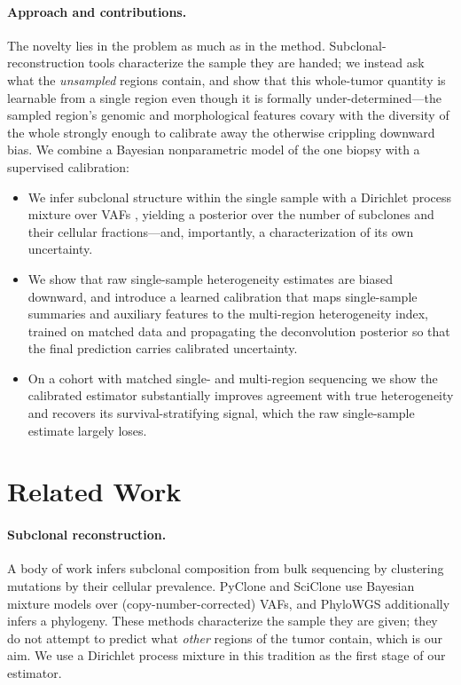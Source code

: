 \documentclass{article}
\begin{document}
\paragraph{Approach and contributions.} The novelty lies in the problem as much as in
the method. Subclonal-reconstruction tools \citep{Roth2014,Miller2014} characterize
the sample they are handed; we instead ask what the \emph{unsampled} regions contain,
and show that this whole-tumor quantity is learnable from a single region even though
it is formally under-determined---the sampled region's genomic and morphological
features covary with the diversity of the whole strongly enough to calibrate away the
otherwise crippling downward bias. We combine a Bayesian nonparametric model of the
one biopsy with a supervised calibration:
\begin{itemize}
\item We infer subclonal structure within the single sample with a Dirichlet process
mixture over VAFs \citep{Roth2014,Miller2014}, yielding a posterior over the number
of subclones and their cellular fractions---and, importantly, a characterization of
its own uncertainty.
\item We show that raw single-sample heterogeneity estimates are biased downward, and
introduce a learned calibration that maps single-sample summaries and auxiliary
features to the multi-region heterogeneity index, trained on matched data and
propagating the deconvolution posterior so that the final prediction carries
calibrated uncertainty.
\item On a cohort with matched single- and multi-region sequencing we show the
calibrated estimator substantially improves agreement with true heterogeneity and
recovers its survival-stratifying signal, which the raw single-sample estimate
largely loses.
\end{itemize}

\section{Related Work}

\paragraph{Subclonal reconstruction.} A body of work infers subclonal composition
from bulk sequencing by clustering mutations by their cellular prevalence. PyClone
\citep{Roth2014} and SciClone \citep{Miller2014} use Bayesian mixture models over
(copy-number-corrected) VAFs, and PhyloWGS \citep{Deshwar2015} additionally infers a
phylogeny. These methods characterize the sample they are given; they do not attempt
to predict what \emph{other} regions of the tumor contain, which is our aim. We use a
Dirichlet process mixture in this tradition as the first stage of our estimator.
\end{document}
